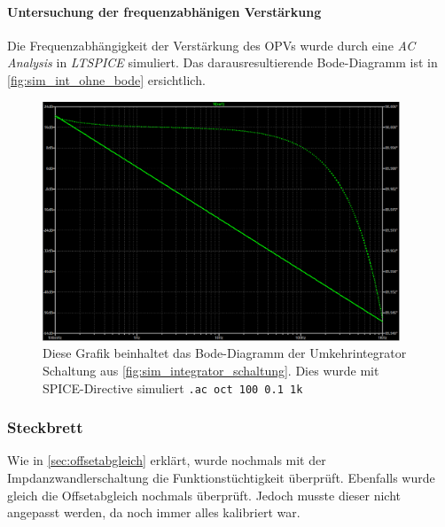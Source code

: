 \documentclass[12pt,english,ngerman]{scrartcl}
\begin{document}
\paragraph{Untersuchung der frequenzabhänigen Verstärkung}
Die Frequenzabhängigkeit der Verstärkung des OPVs wurde durch eine \textit{AC
Analysis} in \textit{LTSPICE} simuliert. Das darausresultierende Bode-Diagramm
ist in \autoref{fig:sim_int_ohne_bode} ersichtlich.

\begin{figure}[H]
  \centering
    \includegraphics[width=0.95\textwidth]{./figures/integrator/sim/umkehr_int/bode_freq_analysis.png}
    \caption{Diese Grafik beinhaltet das Bode-Diagramm der Umkehrintegrator
    Schaltung aus \autoref{fig:sim_integrator_schaltung}. Dies wurde mit
  SPICE-Directive simuliert \texttt{.ac oct 100 0.1 1k}}
  \label{fig:sim_int_ohne_bode}
\end{figure}


\subsubsection{Steckbrett}
Wie in \autoref{sec:offsetabgleich} erklärt, wurde nochmals mit der
Impdanzwandlerschaltung die Funktionstüchtigkeit überprüft. Ebenfalls wurde
gleich die Offsetabgleich nochmals überprüft. Jedoch musste dieser nicht
angepasst werden, da noch immer alles kalibriert war.


\end{document}

